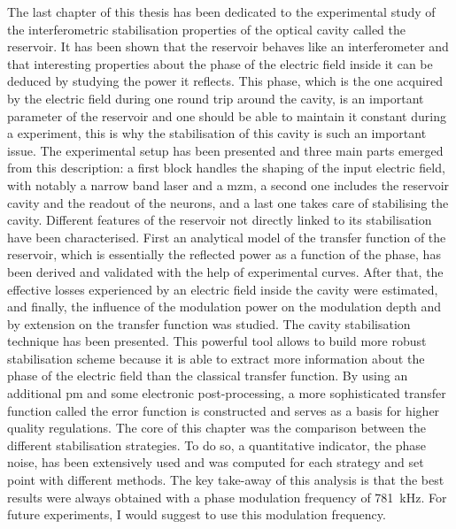 The last chapter of this thesis has been dedicated to the experimental study of the interferometric stabilisation properties of the optical cavity called the reservoir. It has been shown that the reservoir behaves like an interferometer and that interesting properties about the phase of the electric field inside it can be deduced by studying the power it reflects. This phase, which is the one acquired by the electric field during one round trip around the cavity, is an important parameter of the reservoir and one should be able to maintain it constant during a \rcer experiment, this is why the stabilisation of this cavity is such an important issue. The experimental setup has been presented and three main parts emerged from this description: a first block handles the shaping of the input electric field, with notably a narrow band laser and a \gls{mzm}, a second one includes the reservoir cavity and the readout of the neurons, and a last one takes care of stabilising the cavity. Different features of the reservoir not directly linked to its stabilisation have been characterised. First an analytical model of the transfer function of the reservoir, which is essentially the reflected power as a function of the phase, has been derived and validated with the help of experimental curves. After that, the effective losses experienced by an electric field inside the cavity were estimated, and finally, the influence of the modulation power on the modulation depth and by extension on the transfer function was studied. The \pdh cavity stabilisation technique has been presented. This powerful tool allows to build more robust stabilisation scheme because it is able to extract more information about the phase of the electric field than the classical transfer function. By using an additional \gls{pm} and some electronic post-processing, a more sophisticated transfer function called the error function is constructed and serves as a basis for higher quality regulations. The core of this chapter was the comparison between the different stabilisation strategies. To do so, a quantitative indicator, the phase noise, has been extensively used and was computed for each strategy and set point with different methods. The key take-away of this analysis is that the best results were always obtained with a \pdh phase modulation frequency of \SI{781}{\kilo\hertz}. For future \rcer experiments, I would suggest to use this modulation frequency.\\

